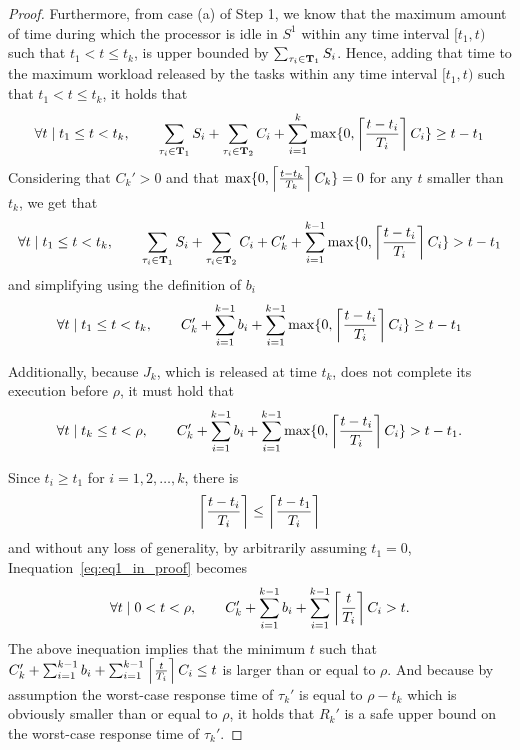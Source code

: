 \begin{proof}
Furthermore, from case (a) of Step 1, we know that the maximum amount of time during which the processor is idle in $S^1$ within any time interval $[t_1, t)$ such that $t_1 < t \leq t_k$, is upper bounded by $\sum_{\tau_i \in {\bf T}_1} S_i$. %
Hence, adding that time to the maximum workload released by the tasks within any time interval $[t_1, t)$ such that $t_1 < t \leq t_k$, it holds that
\[
\forall t \mid t_1 \leq t < t_k,\qquad  \sum_{\tau_i \in {\bf T}_1} S_i + \sum_{\tau_i \in {\bf T}_2} C_i + \sum_{i=1}^{k} \max\{ 0, \left\lceil{\frac{t- t_i}{T_i} }\right\rceil C_i\}  \geq t-t_1
\]
Considering that $C_k' > 0$ and that $\max\{ 0, \left\lceil{\frac{t- t_k}{T_k} }\right\rceil C_k\} = 0$ for any $t$ smaller than $t_k$, we get that
\[
\forall t \mid t_1 \leq t < t_k,\qquad  \sum_{\tau_i \in {\bf T}_1} S_i + \sum_{\tau_i \in {\bf T}_2} C_i + C_k' + \sum_{i=1}^{k-1} \max\{ 0, \left\lceil{\frac{t- t_i}{T_i} }\right\rceil C_i\}  > t-t_1
\]
and simplifying using the definition of $b_i$
\begin{equation}
\label{eq:eq1_in_proof}
\forall t \mid t_1 \leq t < t_k,\qquad  C_k'+\sum_{i=1}^{k-1} b_i + \sum_{i=1}^{k-1} \max\{ 0, \left\lceil{\frac{t- t_i}{T_i} }\right\rceil C_i\} \geq t-t_1
\end{equation}

Additionally, because $J_k$, which is released at time $t_k$, does not complete its execution before $\rho$, it must hold that
\begin{equation}
\label{eq:eq1_in_proof}
\forall t \mid t_k \leq t < \rho,\qquad  C_k'+\sum_{i=1}^{k-1} b_i + \sum_{i=1}^{k-1} \max\{ 0, \left\lceil{\frac{t- t_i}{T_i} }\right\rceil C_i\} > t-t_1.
\end{equation}

Since $t_i \geq t_1$ for $i=1,2,\ldots,k$, there is 
$$\left\lceil{\frac{t- t_i}{T_i} }\right\rceil \leq \left\lceil{\frac{t- t_1}{T_i} }\right\rceil$$ and without any loss of generality, by arbitrarily assuming $t_1 =0$, Inequation~\ref{eq:eq1_in_proof} becomes
\[
\forall t \mid 0 < t < \rho, \qquad C_k'+\sum_{i=1}^{k-1} b_i + \sum_{i=1}^{k-1} \left\lceil{\frac{t}{T_i} }\right\rceil C_i > t.
\]
The above inequation implies that the minimum $t$ such that $C_k'+\sum_{i=1}^{k-1} b_i + \sum_{i=1}^{k-1} \left\lceil{\frac{t}{T_i} }\right\rceil C_i \leq t$ is larger than or equal to $\rho$. And because by assumption the worst-case response time of $\tau_k'$ is equal to $\rho-t_k$ which is obviously smaller than or equal to $\rho$, it holds that $R_k'$ is a safe upper bound on the worst-case response time of $\tau_k'$.
\end{proof}

